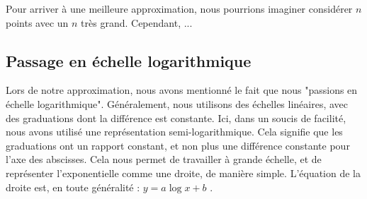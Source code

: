 Pour arriver à une meilleure approximation, nous pourrions imaginer considérer $n$ points avec un 
$n$ très grand. Cependant, ...

\subsection{Passage en échelle logarithmique}

Lors de notre approximation, nous avons mentionné le fait que nous "passions en échelle logarithmique". 
Généralement, nous utilisons des échelles linéaires, avec des graduations dont la différence est constante.
Ici, dans un soucis de facilité, nous avons utilisé une représentation semi-logarithmique. Cela signifie
que les graduations ont un rapport constant, et non plus une différence constante pour l'axe des abscisses.
Cela nous permet de travailler à grande échelle, et de représenter l'exponentielle comme une droite, de
manière simple. L'équation de la droite est, en toute généralité : $y=a\log{x}+b$ .


